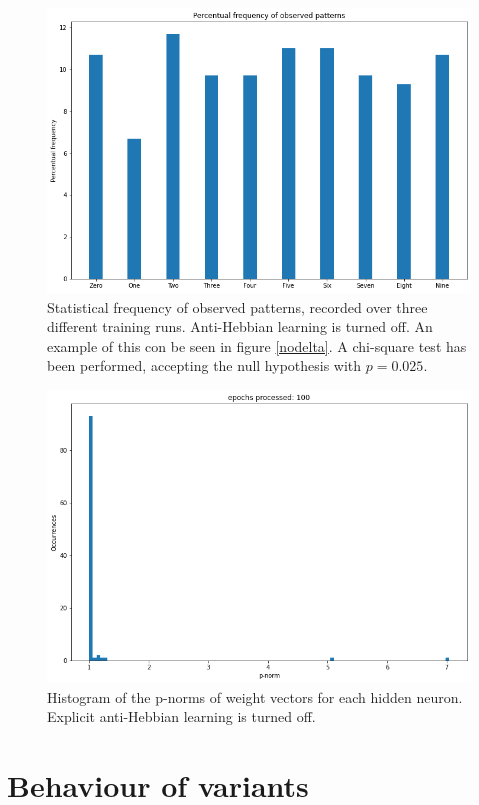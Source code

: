 \documentclass[a4paper]{report}
\begin{document}
\begin{figure} [H]
    \centering
    \includegraphics [width=12cm ] {o/bar1.png}
    \caption{Statistical frequency of observed patterns, recorded over three different training runs. Anti-Hebbian learning is turned off. An example of this con be seen in figure \ref{nodelta}. A chi-square test has been performed, accepting the null hypothesis with $p  = 0.025$.}
    \label{o/cerchio2}
\end{figure}
\begin{figure} [H]
\centering
\includegraphics [width=12cm ] {o/ii_hist.png}
\caption{Histogram of the p-norms of weight vectors for each hidden neuron. Explicit anti-Hebbian learning is turned off. }
\label{ii_hist}
\end{figure}

\chapter{Behaviour of variants}
\end{document}
